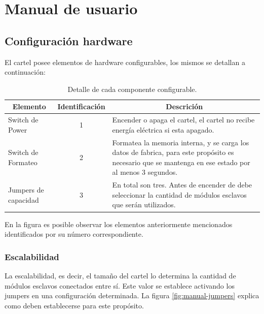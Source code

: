 \section{Manual de usuario}

\subsection{Configuración hardware}

El cartel posee elementos de hardware configurables, los mismos se detallan a continuación:

\begin{table}[ht!]
	\centering
	\caption{Detalle de cada componente configurable.}
	\label{my-label}
	\begin{tabular}{lcp{}}
		\multicolumn{1}{c}{Elemento}	& Identificación & \multicolumn{1}{c}{Descrición} \\ \hline
		Switch de Power         		& 1              & Encender o apaga el cartel, el cartel no recibe energía eléctrica si esta apagado. \\ \hline
		Switch de Formateo      		& 2              & Formatea la memoria interna, y se carga los datos de fabrica, para este propósito es necesario que se mantenga en ese estado por al menos 3 segundos. \\ \hline
		Jumpers de capacidad 			& 3              & En total son tres. Antes de encender de debe seleccionar la cantidad de módulos esclavos que serán utilizados. \\ \hline
	\end{tabular}
\end{table}

En la figura es posible observar los elementos anteriormente mencionados identificados por su número correspondiente.

\subsubsection{Escalabilidad}
La escalabilidad, es decir, el tamaño del cartel lo determina la cantidad de módulos esclavos conectados entre sí. Este valor se establece activando los jumpers en una configuración determinada. La figura \ref{fig:manual-jumpers} explica como deben establecerse para este propósito.

